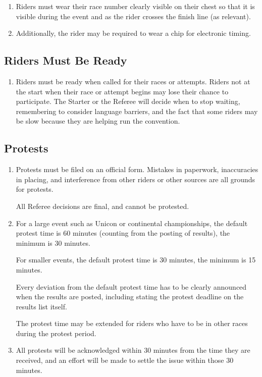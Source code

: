 \begin{enumerate}[leftmargin=1.5em,labelsep=*]
  \item Riders must wear their race number clearly visible on their chest so that it is visible during the event and as the rider crosses the finish line (as relevant).
  \item Additionally, the rider may be required to wear a chip for electronic timing.
\end{enumerate}

\subsection{Riders Must Be Ready}

\begin{enumerate}[leftmargin=1.5em,labelsep=*]
  \item Riders must be ready when called for their races or attempts.
    Riders not at the start when their race or attempt begins may lose their chance to participate.
    The Starter or the Referee will decide when to stop waiting, remembering to consider language barriers, and the fact 
    that some riders may be slow because they are helping run the convention.
\end{enumerate}

\subsection{Protests}

\begin{enumerate}[leftmargin=1.5em,labelsep=*]
  \item Protests must be filed on an official form.
    Mistakes in paperwork, inaccuracies in placing, and interference from other riders or other sources are all grounds for protests.
    
    All Referee decisions are final, and cannot be protested.
  \item For a large event such as Unicon or continental championships, the default protest time is 60 minutes 
    (counting from the posting of results), the minimum is 30 minutes.

    For smaller events, the default protest time is 30 minutes, the minimum is 15 minutes.

    Every deviation from the default protest time has to be clearly announced when the results are posted, 
    including stating the protest deadline on the results list itself.
    
    The protest time may be extended for riders who have to be in other races during the protest period.
  \item All protests will be acknowledged within 30 minutes from the time they are received, 
    and an effort will be made to settle the issue within those 30 minutes.
\end{enumerate}

